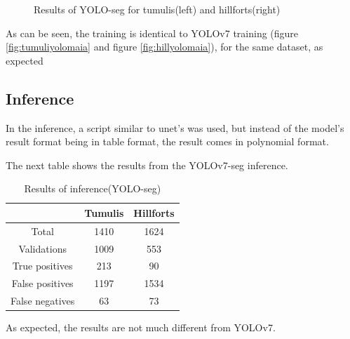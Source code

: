 \begin{figure}[H]
    \centering
    \qquad
    \caption{Results of YOLO-seg for tumulis(left) and hillforts(right)}%
\end{figure}

As can be seen, the training is identical to YOLOv7 training (figure \ref{fig:tumuliyolomaia} and figure \ref{fig:hillyolomaia}), for the same dataset, as expected

\subsection{Inference}
In the inference, a script similar to unet's was used, but instead of the model's result format being in table format, the result comes in polynomial format.

The next table shows the results from the YOLOv7-seg inference.

\begin{table}[H]
\centering
\begin{tabular}{|c c c|} 
 \hline
  &  Tumulis & Hillforts \\ [0.5ex] 
 \hline\hline
 Total & 1410 & 1624 \\ 
 Validations & 1009 & 553 \\
 True positives & 213 & 90 \\
 False positives & 1197 & 1534 \\
 False negatives & 63 & 73\\ [1ex] 
 \hline
\end{tabular}
\caption{Results of inference(YOLO-seg)}
\end{table}

As expected, the results are not much different from YOLOv7.